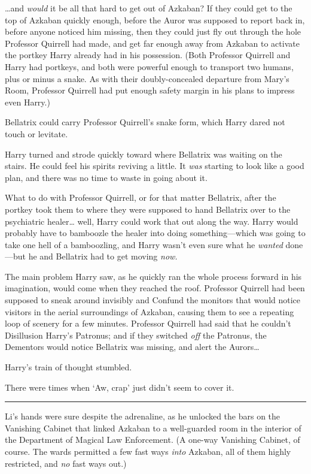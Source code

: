 \ldots{}and \emph{would} it be all that hard to get out of Azkaban? If
they could get to the top of Azkaban quickly enough, before the Auror
was supposed to report back in, before anyone noticed him missing, then
they could just fly out through the hole Professor Quirrell had made,
and get far enough away from Azkaban to activate the portkey Harry
already had in his possession. (Both Professor Quirrell and Harry had
portkeys, and both were powerful enough to transport two humans, plus or
minus a snake. As with their doubly-concealed departure from Mary's
Room, Professor Quirrell had put enough safety margin in his plans to
impress even Harry.)

Bellatrix could carry Professor Quirrell's snake form, which Harry dared
not touch or levitate.

Harry turned and strode quickly toward where Bellatrix was waiting on
the stairs. He could feel his spirits reviving a little. It \emph{was}
starting to look like a good plan, and there was no time to waste in
going about it.

What to do with Professor Quirrell, or for that matter Bellatrix, after
the portkey took them to where they were supposed to hand Bellatrix over
to the psychiatric healer\ldots{} well, Harry could work that out along
the way. Harry would probably have to bamboozle the healer into doing
something---which was going to take one hell of a bamboozling, and Harry
wasn't even sure what he \emph{wanted} done---but he and Bellatrix had
to get moving \emph{now.}

The main problem Harry saw, as he quickly ran the whole process forward
in his imagination, would come when they reached the roof. Professor
Quirrell had been supposed to sneak around invisibly and Confund the
monitors that would notice visitors in the aerial surroundings of
Azkaban, causing them to see a repeating loop of scenery for a few
minutes. Professor Quirrell had said that he couldn't Disillusion
Harry's Patronus; and if they switched \emph{off} the Patronus, the
Dementors would notice Bellatrix was missing, and alert the
Aurors\ldots{}

Harry's train of thought stumbled.

There were times when `Aw, crap' just didn't seem to cover it.

\begin{center}\rule{3in}{0.4pt}\end{center}

Li's hands were sure despite the adrenaline, as he unlocked the bars on
the Vanishing Cabinet that linked Azkaban to a well-guarded room in the
interior of the Department of Magical Law Enforcement. (A one-way
Vanishing Cabinet, of course. The wards permitted a few fast ways
\emph{into} Azkaban, all of them highly restricted, and \emph{no} fast
ways out.)

